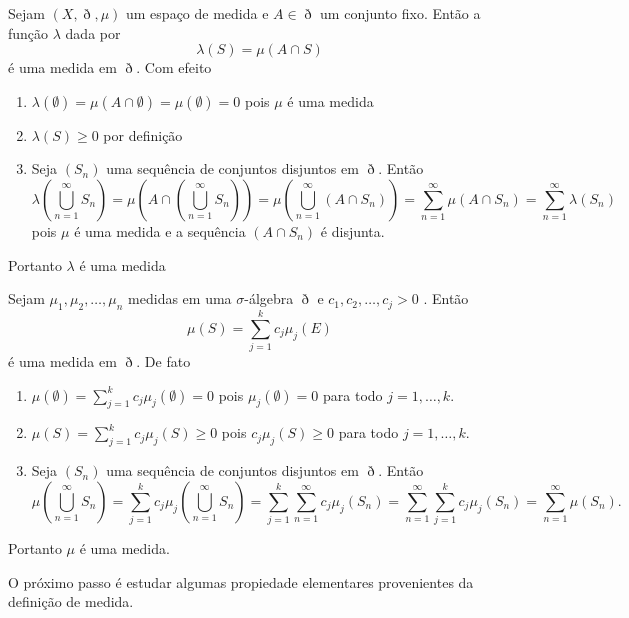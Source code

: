 \documentclass[a4paper, 11pt]{book}
\theoremstyle{definition}
\begin{document}
\begin{ex}
    Sejam $(X,\eth,\mu)$ um espaço de medida e $A \in \eth$ um conjunto fixo.
    Então a função $\lambda$ dada por
    \[
        \lambda(S) = \mu(A \cap S)
    \]
    é uma medida em $\eth$.
    Com efeito
    \begin{enumerate}[leftmargin=*]
        \item $\lambda(\emptyset) = \mu(A \cap \emptyset) = \mu(\emptyset) = 0$ pois $\mu$ é uma medida
        \item $\lambda(S) \geqslant 0$ por definição
        \item Seja $(S_n)$ uma sequência de conjuntos disjuntos em $\eth$. Então
        \[
            \lambda \left( \bigcup_{n=1}^{\infty} S_n \right) = \mu\left( A \cap \left( \bigcup_{n=1}^{\infty} S_n \right) \right) = \mu \left( \bigcup_{n=1}^{\infty} (A \cap S_n) \right) = \sum_{n=1}^{\infty} \mu(A \cap S_n) = \sum_{n=1}^{\infty} \lambda(S_n)
        \]
        pois $\mu$ é uma medida e a sequência $(A \cap S_n)$ é disjunta.
    \end{enumerate}
    Portanto $\lambda$ é uma medida
\end{ex}

\begin{ex}
    Sejam $\mu_1,\mu_2,\dots,\mu_n$ medidas em uma $\sigma$-álgebra $\eth$ e $c_1,c_2,\dots,c_j > 0$ . Então
    \[
        \mu(S) = \sum_{j=1}^{k} c_j \mu_j(E)
    \]
    é uma medida em $\eth$.
    De fato
    \begin{enumerate}[leftmargin=*]
        \item $\mu(\emptyset) = \sum_{j=1}^k c_j \mu_j(\emptyset) = 0$ pois $\mu_j(\emptyset) = 0$ para todo $j = 1,\dots,k$.
        \item $\mu(S) = \sum_{j=1}^k c_j \mu_j(S) \geqslant 0$ pois $c_j\mu_j(S) \geqslant 0$ para todo $j = 1,\dots,k$.
        \item Seja $(S_n)$ uma sequência de conjuntos disjuntos em $\eth$. Então
        \[
            \mu\left( \bigcup_{n=1}^{\infty} S_n \right) = \sum_{j=1}^{k} c_j \mu_j\left( \bigcup_{n=1}^{\infty} S_n \right) = \sum_{j=1}^{k} \sum_{n=1}^{\infty} c_j \mu_j(S_n) =\sum_{n=1}^{\infty}\sum_{j=1}^{k}  c_j \mu_j(S_n)  = \sum_{n=1}^{\infty} \mu(S_n).
        \]
    \end{enumerate}
    Portanto $\mu$ é uma medida.
\end{ex}

O próximo passo é estudar algumas propiedade elementares provenientes da definição de medida.
\end{document}
